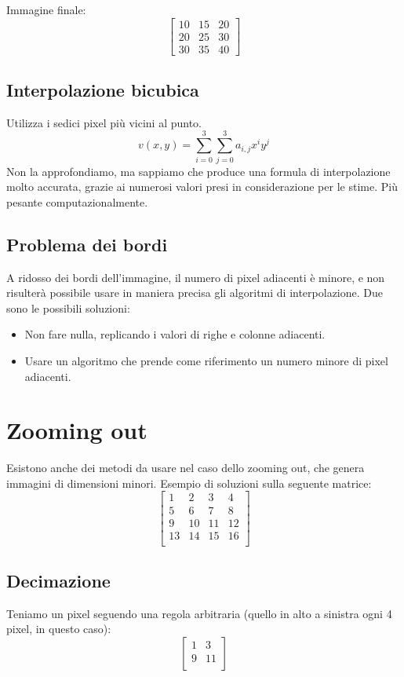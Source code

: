 \documentclass{report}
\begin{document}
Immagine finale:
$$
\begin{bmatrix}
	10 & 15 & 20 \\
	20 & 25 & 30 \\
	30 & 35 & 40 
\end{bmatrix}
$$

\subsection{Interpolazione bicubica}
Utilizza i sedici pixel più vicini al punto.
$$
v(x,y) = \sum_{i=0}^{3} \sum_{j=0}^{3} a_{i,j} x^iy^j
$$
Non la approfondiamo, ma sappiamo che produce una formula di interpolazione molto accurata, grazie ai numerosi valori presi in considerazione per le stime. Più pesante computazionalmente.

\subsection{Problema dei bordi}
A ridosso dei bordi dell'immagine, il numero di pixel adiacenti è minore, e non risulterà possibile usare in maniera precisa gli algoritmi di interpolazione.
Due sono le possibili soluzioni:
\begin{itemize}
	\item Non fare nulla, replicando i valori di righe e colonne adiacenti.
	\item Usare un algoritmo che prende come riferimento un numero minore di pixel adiacenti.
\end{itemize}



\section{Zooming out}
Esistono anche dei metodi da usare nel caso dello zooming out, che genera immagini di dimensioni minori.
Esempio di soluzioni sulla seguente matrice:
$$
\begin{bmatrix}
	1  & 2  & 3  & 4  \\
	5  & 6  & 7  & 8  \\
	9  & 10 & 11 & 12 \\
	13 & 14 & 15 & 16 \\
\end{bmatrix}
$$

\subsection{Decimazione}
Teniamo un pixel seguendo una regola arbitraria (quello in alto a sinistra ogni 4 pixel, in questo caso):
$$
\begin{bmatrix}
	1 & 3  \\
	9 & 11 \\
\end{bmatrix}
$$
\end{document}
